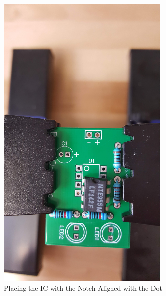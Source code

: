 \documentclass{article}
\begin{document}
\begin{enumerate}
      
\begin{figure}[H]
\caption{ Placing the IC with the Notch Aligned with the Dot }
\label{fig:img/0025.jpg}
\centering
\includegraphics[width=0.75\textwidth]{img/0025.jpg}
\end{figure}


\end{enumerate}
\end{document}
